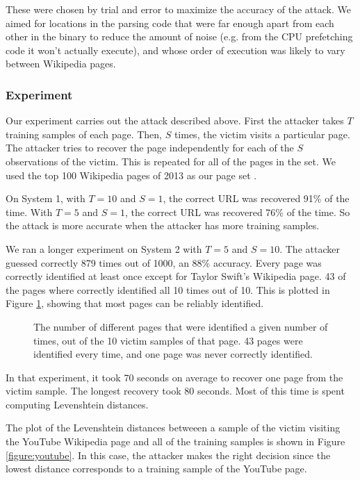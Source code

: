 \documentclass[letterpaper,twocolumn,10pt]{article}
\begin{document}
These were chosen by trial and error to maximize the accuracy of the attack. We
aimed for locations in the parsing code that were far enough apart from each
other in the binary to reduce the amount of noise (e.g. from the CPU prefetching
code it won't actually execute), and whose order of execution was likely to vary
between Wikipedia pages.

\subsubsection{Experiment}

Our experiment carries out the attack described above. First the attacker takes
$T$ training samples of each page. Then, $S$ times, the victim visits
a particular page. The attacker tries to recover the page independently for each
of the $S$ observations of the victim. This is repeated for all of the pages in
the set. We used the top 100 Wikipedia pages of 2013 as our page set
\cite{wikitop2013}.

On System 1, with $T=10$ and $S=1$, the correct URL was recovered 91\% of the
time. With $T=5$ and $S=1$, the correct URL was
recovered 76\% of the time. So the attack is more
accurate when the attacker has more training samples.

We ran a longer experiment on System 2 with $T=5$ and
$S=10$. The attacker guessed correctly 879 times out of 1000, an 88\% accuracy.
Every page was correctly identified at least once except for Taylor Swift's
Wikipedia page. 43 of the pages where correctly identified all 10 times out of
10. This is plotted in Figure \ref{figure:identifycounts}, showing that most
pages can be reliably identified.

\begin{figure}
    \centering
    
    \caption{The number of different
    pages that were identified a given number of times, out of the 10 victim
samples of that page. 43 pages were identified every time, and one page was
never correctly identified.}
    \label{figure:identifycounts}
\end{figure}

In that experiment, it took 70 seconds on average to recover one page from the
victim sample. The longest recovery took 80 seconds. Most of this time is spent
computing Levenshtein distances.

The plot of the Levenshtein distances betweeen a sample of the victim visiting
the YouTube Wikipedia page and all of the training samples is shown in Figure
\ref{figure:youtube}. In this case, the attacker makes the right decision since
the lowest distance corresponds to a training sample of the YouTube page.
\end{document}
